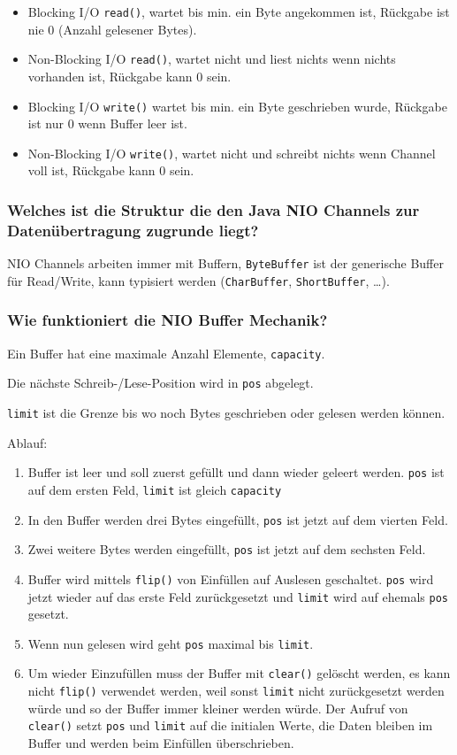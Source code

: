 \documentclass[10pt,a4paper]{scrartcl}
\begin{document}
\begin{itemize}
	\item Blocking I/O \texttt{read()}, wartet bis min. ein Byte angekommen ist, Rückgabe ist nie 0
		(Anzahl gelesener Bytes).
	\item Non-Blocking I/O \texttt{read()}, wartet nicht und liest nichts wenn nichts vorhanden ist,
		Rückgabe kann 0 sein.
	\item Blocking I/O \texttt{write()} wartet bis min. ein Byte geschrieben wurde, Rückgabe ist nur 0
		wenn Buffer leer ist.
	\item Non-Blocking I/O \texttt{write()}, wartet nicht und schreibt nichts wenn Channel voll ist,
		Rückgabe kann 0 sein.
\end{itemize}

\subsubsection{Welches ist die Struktur die den Java NIO Channels zur Datenübertragung zugrunde liegt?}

NIO Channels arbeiten immer mit Buffern, \texttt{ByteBuffer} ist der generische Buffer für
Read/Write, kann typisiert werden (\texttt{CharBuffer}, \texttt{ShortBuffer}, \ldots). 
  
\subsubsection{Wie funktioniert die NIO Buffer Mechanik?}

Ein Buffer hat eine maximale Anzahl Elemente, \texttt{capacity}.

Die nächste Schreib-/Lese-Position wird in \texttt{pos} abgelegt.

\texttt{limit} ist die Grenze bis wo noch Bytes geschrieben oder gelesen werden können.

Ablauf:
\begin{enumerate}
	\item Buffer ist leer und soll zuerst gefüllt und dann wieder geleert werden. \texttt{pos} ist auf
		dem ersten Feld, \texttt{limit} ist gleich \texttt{capacity}  
	\item In den Buffer werden drei Bytes eingefüllt, \texttt{pos} ist jetzt auf dem vierten Feld.  
	\item Zwei weitere Bytes werden eingefüllt, \texttt{pos} ist jetzt auf dem sechsten Feld.  
	\item Buffer wird mittels \texttt{flip()} von Einfüllen auf Auslesen geschaltet. \texttt{pos} wird
		jetzt wieder auf das erste Feld zurückgesetzt und \texttt{limit} wird auf ehemals \texttt{pos}
		gesetzt.
	\item Wenn nun gelesen wird geht \texttt{pos} maximal bis \texttt{limit}.  
	\item Um wieder Einzufüllen muss der Buffer mit \texttt{clear()} gelöscht werden, es kann nicht
		\texttt{flip()} verwendet werden, weil sonst \texttt{limit} nicht zurückgesetzt werden würde und
		so der Buffer immer kleiner werden würde. Der Aufruf von \texttt{clear()} setzt \texttt{pos} und
		\texttt{limit} auf die initialen Werte, die Daten bleiben im Buffer und werden beim Einfüllen
		überschrieben.
\end{enumerate}
  
\end{document}
